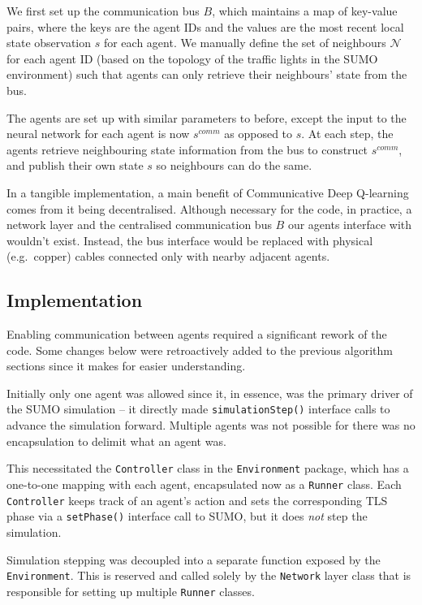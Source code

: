 \documentclass[a4paper]{report}
\begin{document}
We first set up the communication bus $B$, which maintains a map of key-value pairs, where the keys are the agent IDs and the values are the most recent local state observation $s$ for each agent. We manually define the set of neighbours $\mathcal{N}$ for each agent ID (based on the topology of the traffic lights in the SUMO environment) such that agents can only retrieve their neighbours' state from the bus.

The agents are set up with similar parameters to before, except the input to the neural network for each agent is now $s^{comm}$ as opposed to $s$. At each step, the agents retrieve neighbouring state information from the bus to construct $s^{comm}$, and publish their own state $s$ so neighbours can do the same.

In a tangible implementation, a main benefit of Communicative Deep Q-learning comes from it being decentralised. Although necessary for the code, in practice, a network layer and the centralised communication bus $B$ our agents interface with wouldn't exist. Instead, the bus interface would be replaced with physical (e.g.\ copper) cables connected only with nearby adjacent agents.

\subsection{Implementation}

Enabling communication between agents required a significant rework of the code. Some changes below were retroactively added to the previous algorithm sections since it makes for easier understanding.

Initially only one agent was allowed since it, in essence, was the primary driver of the SUMO simulation -- it directly made \texttt{simulationStep()} interface calls to advance the simulation forward. Multiple agents was not possible for there was no encapsulation to delimit what an agent was.

This necessitated the \texttt{Controller} class in the \texttt{Environment} package, which has a one-to-one mapping with each agent, encapsulated now as a \texttt{Runner} class. Each \texttt{Controller} keeps track of an agent's action and sets the corresponding TLS phase via a \texttt{setPhase()} interface call to SUMO, but it does \emph{not} step the simulation.

Simulation stepping was decoupled into a separate function exposed by the \texttt{Environment}. This is reserved and called solely by the \texttt{Network} layer class that is responsible for setting up multiple \texttt{Runner} classes.
\end{document}
